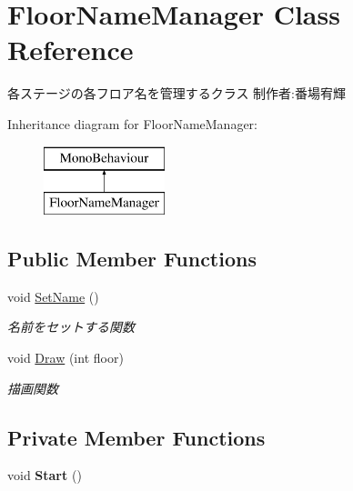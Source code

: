 \hypertarget{class_floor_name_manager}{}\section{Floor\+Name\+Manager Class Reference}
\label{class_floor_name_manager}


各ステージの各フロア名を管理するクラス 制作者\+:番場宥輝  


Inheritance diagram for Floor\+Name\+Manager\+:\begin{figure}[H]
\begin{center}
\leavevmode
\includegraphics[height=2.000000cm]{class_floor_name_manager}
\end{center}
\end{figure}
\subsection*{Public Member Functions}
\begin{DoxyCompactItemize}
\item 
void \hyperlink{class_floor_name_manager_a3e0fb0fce8e686a9bde048d606bbb2e4}{Set\+Name} ()
\begin{DoxyCompactList}\small\item\em 名前をセットする関数 \end{DoxyCompactList}\item 
void \hyperlink{class_floor_name_manager_a226c28a82232989bc58ddc4d60f11fbb}{Draw} (int floor)
\begin{DoxyCompactList}\small\item\em 描画関数 \end{DoxyCompactList}\end{DoxyCompactItemize}
\subsection*{Private Member Functions}
\begin{DoxyCompactItemize}
\item 
\mbox{\label{class_floor_name_manager_addf85cadeea4fba5e5a84c65e4f9255c}} 
void {\bfseries Start} ()
\end{DoxyCompactItemize}
